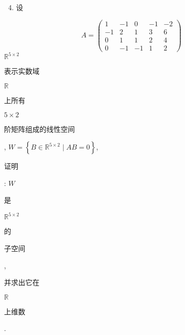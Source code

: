\documentclass[10pt]{article}
\begin{document}
\begin{enumerate}
  \setcounter{enumi}{3}
  \item \begin{CJK}{UTF8}{mj}设\end{CJK}
\end{enumerate}
$$
A=\left(\begin{array}{ccccc}
1 & -1 & 0 & -1 & -2 \\
-1 & 2 & 1 & 3 & 6 \\
0 & 1 & 1 & 2 & 4 \\
0 & -1 & -1 & 1 & 2
\end{array}\right)
$$
$\mathbb{R}^{5 \times 2}$ \begin{CJK}{UTF8}{mj}表示实数域\end{CJK} $\mathbb{R}$ \begin{CJK}{UTF8}{mj}上所有\end{CJK} $5 \times 2$ \begin{CJK}{UTF8}{mj}阶矩阵组成的线性空间\end{CJK}, $W=\left\{B \in \mathbb{R}^{5 \times 2} \mid A B=0\right\}$, \begin{CJK}{UTF8}{mj}证明\end{CJK}: $W$ \begin{CJK}{UTF8}{mj}是\end{CJK} $\mathbb{R}^{5 \times 2}$ \begin{CJK}{UTF8}{mj}的\end{CJK} \begin{CJK}{UTF8}{mj}子空间\end{CJK}, \begin{CJK}{UTF8}{mj}并求出它在\end{CJK} $\mathbb{R}$ \begin{CJK}{UTF8}{mj}上维数\end{CJK}.
\end{document}

